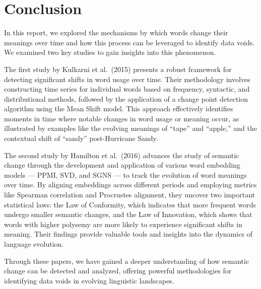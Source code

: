 
\section{Conclusion}\label{sec:}
In this report, we explored the mechanisms by which words change their meanings over time and how this process can be leveraged to identify data voids.
We examined two key studies to gain insights into this phenomenon.

The first study by Kulkarni et al.\ (2015) presents a robust framework for detecting significant shifts in word usage over time.
Their methodology involves constructing time series for individual words based on frequency, syntactic, and distributional methods, followed by the application of a change point detection algorithm using the Mean Shift model.
This approach effectively identifies moments in time where notable changes in word usage or meaning occur, as illustrated by examples like the evolving meanings of “tape” and “apple,” and the contextual shift of “sandy” post-Hurricane Sandy.

The second study by Hamilton et al.\ (2016) advances the study of semantic change through the development and application of various word embedding models — PPMI, SVD, and SGNS — to track the evolution of word meanings over time.
By aligning embeddings across different periods and employing metrics like Spearman correlation and Procrustes alignment,
they uncover two important statistical laws: the Law of Conformity, which indicates that more frequent words undergo smaller semantic changes,
and the Law of Innovation, which shows that words with higher polysemy are more likely to experience significant shifts in meaning.
Their findings provide valuable tools and insights into the dynamics of language evolution.

Through these papers, we have gained a deeper understanding of how semantic change can be detected and analyzed,
offering powerful methodologies for identifying data voids in evolving linguistic landscapes.